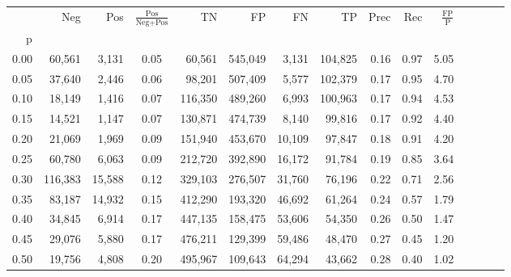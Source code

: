 \begin{tabular}{rrrcrrrrrrrrrrr}
\toprule
{} &      Neg &     Pos & $\frac{\text{Pos}}{\text{Neg}+\text{Pos}}$ &       TN &       FP &       FN &       TP &  Prec &   Rec & $\frac{\text{FP}}{\text{P}}$ \\
p    &          &         &                                            &          &          &          &          &       &       &                              \\
\midrule
0.00 &   60,561 &   3,131 &                                       0.05 &   60,561 &  545,049 &    3,131 &  104,825 &  0.16 &  0.97 &                         5.05 \\
0.05 &   37,640 &   2,446 &                                       0.06 &   98,201 &  507,409 &    5,577 &  102,379 &  0.17 &  0.95 &                         4.70 \\
0.10 &   18,149 &   1,416 &                                       0.07 &  116,350 &  489,260 &    6,993 &  100,963 &  0.17 &  0.94 &                         4.53 \\
0.15 &   14,521 &   1,147 &                                       0.07 &  130,871 &  474,739 &    8,140 &   99,816 &  0.17 &  0.92 &                         4.40 \\
0.20 &   21,069 &   1,969 &                                       0.09 &  151,940 &  453,670 &   10,109 &   97,847 &  0.18 &  0.91 &                         4.20 \\
0.25 &   60,780 &   6,063 &                                       0.09 &  212,720 &  392,890 &   16,172 &   91,784 &  0.19 &  0.85 &                         3.64 \\
0.30 &  116,383 &  15,588 &                                       0.12 &  329,103 &  276,507 &   31,760 &   76,196 &  0.22 &  0.71 &                         2.56 \\
0.35 &   83,187 &  14,932 &                                       0.15 &  412,290 &  193,320 &   46,692 &   61,264 &  0.24 &  0.57 &                         1.79 \\
0.40 &   34,845 &   6,914 &                                       0.17 &  447,135 &  158,475 &   53,606 &   54,350 &  0.26 &  0.50 &                         1.47 \\
0.45 &   29,076 &   5,880 &                                       0.17 &  476,211 &  129,399 &   59,486 &   48,470 &  0.27 &  0.45 &                         1.20 \\
0.50 &   19,756 &   4,808 &                                       0.20 &  495,967 &  109,643 &   64,294 &   43,662 &  0.28 &  0.40 &                         1.02 \\

\end{tabular}
